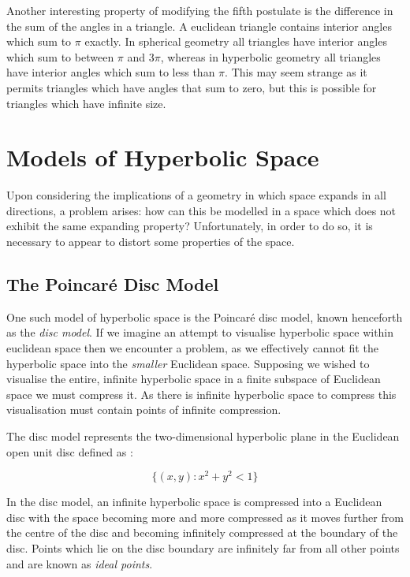 Another interesting property of modifying the fifth postulate is the difference in the sum of the angles in a triangle. A euclidean triangle contains interior angles which sum to $\pi$ exactly. In spherical geometry all triangles have interior angles which sum to between $\pi$ and 3$\pi$, whereas in hyperbolic geometry all triangles have interior angles which sum to less than $\pi$. This may seem strange as it permits triangles which have angles that sum to zero, but this is possible for triangles which have infinite size.

\section{Models of Hyperbolic Space}
\label{sec:LitReviewVisHyperbolic}

Upon considering the implications of a geometry in which space expands in all directions, a problem arises: how can this be modelled in a space which does not exhibit the same expanding property? Unfortunately, in order to do so, it is necessary to appear to distort some properties of the space.

\subsection{The Poincar\'{e} Disc Model}

One such model of hyperbolic space is the Poincar\'{e} disc model, known henceforth as the \textit{disc model}. If we imagine an attempt to visualise hyperbolic space within euclidean space then we encounter a problem, as we effectively cannot fit the hyperbolic space into the \textit{smaller} Euclidean space. Supposing we wished to visualise the entire, infinite hyperbolic space in a finite subspace of Euclidean space we must compress it. As there is infinite hyperbolic space to compress this visualisation must contain points of infinite compression.

The disc model represents the two-dimensional hyperbolic plane in the Euclidean open unit disc defined as \cite{blair_inversion_2000}:

\begin{equation}
\label{eq:open_unit_disc_eq}
\{(x,y):x^2 + y^2 <1\}
\end{equation}
 

In the disc model, an infinite hyperbolic space is compressed into a Euclidean disc with the space becoming more and more compressed as it moves further from the centre of the disc and becoming infinitely compressed at the boundary of the disc. Points which lie on the disc boundary are infinitely far from all other points and are known as \textit{ideal points}.

